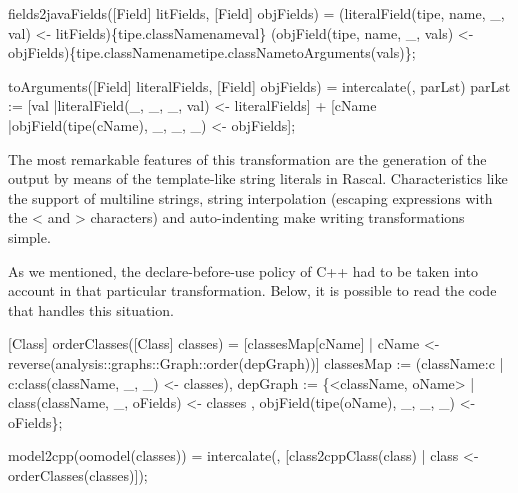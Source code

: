 \documentclass[submission,copyright,creativecommons]{eptcs}
\begin{document}
\begin{rascal}
 fields2javaFields([Field] litFields, [Field] objFields) =
     (literalField(tipe, name, \_{}, val) \textless{}- litFields)\{{}tipe.classNamenameval\}{} (objField(tipe, name, \_{}, vals) \textless{}- objFields)\{{}tipe.classNamenametipe.classNametoArguments(vals)\}{};

 toArguments([Field] literalFields, [Field] objFields) =
    intercalate(, parLst)
     parLst := {}[val |literalField(\_{}, \_{}, \_{},  val) \textless{}- literalFields]
                   + {}[cName |objField(tipe(cName), \_{}, \_{}, \_{}) \textless{}- objFields];
\end{rascal}

The most remarkable features of this transformation are the generation of the output by means of the template-like string literals in Rascal. Characteristics like the support of multiline strings, string interpolation (escaping expressions with the < and > characters) and auto-indenting make writing  transformations simple.

As we mentioned, the declare-before-use policy of C++ had to be taken into account in that particular transformation. Below, it is possible to read the code that handles this situation.

\begin{rascal}
[Class] orderClasses([Class] classes) =
    {}[classesMap{}[cName] | cName \textless{}- reverse(analysis::graphs::Graph::order(depGraph))]
     classesMap := (className:c | c:class(className, \_{}, \_{}) \textless{}- classes),
         depGraph := \{{}\textless{}className, oName\textgreater{} | class(className, \_{}, oFields) \textless{}- classes
                                         , objField(tipe(oName), \_{}, \_{}, \_{}) \textless{}- oFields\}{};

 model2cpp(oomodel(classes)) = 
    intercalate(, {}[class2cppClass(class) | class \textless{}- orderClasses(classes)]);
\end{rascal}
\end{document}
